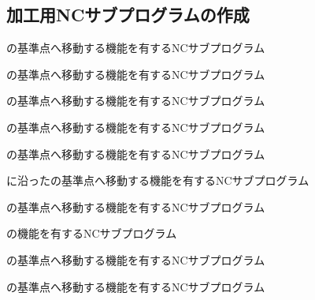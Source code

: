 \subsection{加工用NCサブプログラムの作成}
\begin{enumerate}[label={\sarrow[red]}]
\item \EndFacecutMilling の基準点へ移動する機能を有するNCサブプログラム
\item \OutcutMilling の基準点へ移動する機能を有するNCサブプログラム
\item[\sarrow] \CurvedOutcutMilling の基準点へ移動する機能を有するNCサブプログラム
\item \KeywayMilling の基準点へ移動する機能を有するNCサブプログラム
\item \EndFaceOutCChamferMilling の基準点へ移動する機能を有するNCサブプログラム
\item[\sarrow] \CurvedOutcut に沿った\EndFaceOutCChamferMilling の基準点へ移動する機能を有するNCサブプログラム
\item \EndFaceInCChamferMilling の基準点へ移動する機能を有するNCサブプログラム
\item \DimpleMilling の機能を有するNCサブプログラム
\item[\sarrow] \EndFaceBoringMilling の基準点へ移動する機能を有するNCサブプログラム
\item[\sarrow] \IncutBoringMilling の基準点へ移動する機能を有するNCサブプログラム
\end{enumerate}


